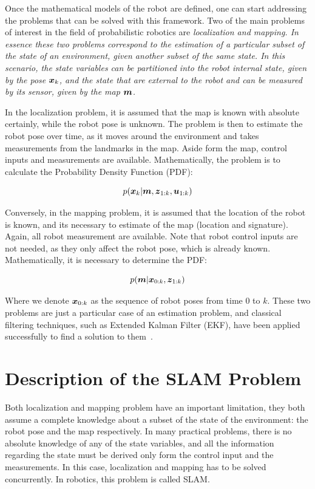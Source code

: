 Once the mathematical models of the robot are defined, one can start addressing the problems that can be solved with this framework. Two of the main problems of interest in the field of probabilistic robotics are \it{localization} and \it{mapping}. In essence these two problems correspond to the estimation of a particular subset of the state of an environment, given another subset of the same state. In this scenario, the state variables can be partitioned into the robot internal state, given by the pose $\boldsymbol{x}_k$, and the state that are external to the robot and can be measured by its sensor, given by the map $\boldsymbol{m}$.

In the localization problem, it is assumed that the map is known with absolute certainly, while the robot pose is unknown. The problem is then to estimate the robot pose over time, as it moves around the environment and takes measurements from the landmarks in the map. Aside form the map, control inputs and measurements are available. Mathematically, the problem is to calculate the Probability Density Function (PDF):

\begin{equation}
p(\boldsymbol{x}_k|\boldsymbol{m},\boldsymbol{z}_{1:k},\boldsymbol{u}_{1:k})
\end{equation}  

Conversely, in the mapping problem, it is assumed that the location of the robot is known, and its necessary to estimate of the map (location and signature). Again, all robot measurement are available. Note that robot control inputs are not needed, as they only affect the robot pose, which is already known. Mathematically, it is necessary to determine the PDF:

\begin{equation}
p(\boldsymbol{m}|\boldsymbol{x}_{0:k},\boldsymbol{z}_{1:k})
\end{equation} 

Where we denote $\boldsymbol{x}_{0:k}$ as the sequence of robot poses from time $0$ to $k$. These two problems are just a particular case of an estimation problem, and classical filtering techniques, such as Extended Kalman Filter (EKF), have been applied successfully to find a solution to them~\cite{probabilistic}.  

\section{Description of the SLAM Problem}
\label{sec:slam-description}

Both localization and mapping problem have an important limitation, they both assume a complete knowledge about a subset of the state of the environment: the robot pose and the map respectively. In many practical problems, there is no absolute knowledge of any of the state variables, and all the information regarding the state must be derived only form the control input and the measurements. In this case, localization and mapping has to be solved concurrently. In robotics, this problem is called SLAM. 

